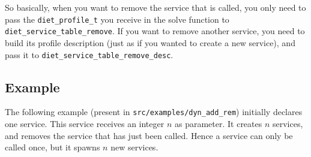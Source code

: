 So basically, when you want to remove the service that is called, you
only need to pass the \verb|diet_profile_t| you receive in the solve
function to \verb|diet_service_table_remove|. If you want to remove
another service, you need to build its profile description (just as if
you wanted to create a new service), and pass it to
\verb|diet_service_table_remove_desc|.


\subsection{Example}

The following example (present in \texttt{src/examples/dyn\_add\_rem})
initially declares one service. This service receives an integer $n$
as parameter. It creates $n$ services, and removes the service that
has just been called. Hence a service can only be called once, but it
spawns $n$ new services.

